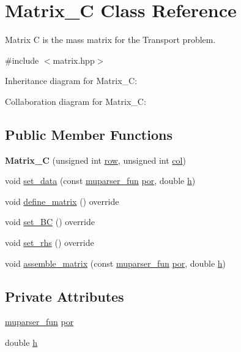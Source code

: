 \hypertarget{classMatrix__C}{}\section{Matrix\+\_\+C Class Reference}
\label{classMatrix__C}


Matrix C is the mass matrix for the Transport problem.  




{\ttfamily \#include $<$matrix.\+hpp$>$}



Inheritance diagram for Matrix\+\_\+C\+:


Collaboration diagram for Matrix\+\_\+C\+:
\subsection*{Public Member Functions}
\begin{DoxyCompactItemize}
\item 
\mbox{\label{classMatrix__C_a9e4a2ba41703e9547e7fa8fccf041966}} 
{\bfseries Matrix\+\_\+C} (unsigned int \hyperlink{classAbstractMatrix_a27fb46bf2853d4927d92a81b8b7773fb}{row}, unsigned int \hyperlink{classAbstractMatrix_af3ad3551ce094979488cef5df0e4fc1d}{col})
\item 
void \hyperlink{classMatrix__C_af91d61fdcd02ac2c6c87d2dbdbdf18a2}{set\+\_\+data} (const \hyperlink{classmuparser__fun}{muparser\+\_\+fun} \hyperlink{classMatrix__C_a45440dbea003cf386406ad510e32bc25}{por}, double \hyperlink{classMatrix__C_ac381c022ef4080ac749c69d92a9f5927}{h})
\item 
void \hyperlink{classMatrix__C_a062ab76d181505d1db2e391f02152376}{define\+\_\+matrix} () override
\item 
void \hyperlink{classMatrix__C_a9235c2dbf2853fae4122251726a7efce}{set\+\_\+\+BC} () override
\item 
void \hyperlink{classMatrix__C_af305bfe533e702d629df3fb0409bc8d2}{set\+\_\+rhs} () override
\item 
void \hyperlink{classMatrix__C_a63752476cb62dc7c22a9b9359f42a995}{assemble\+\_\+matrix} (const \hyperlink{classmuparser__fun}{muparser\+\_\+fun} \hyperlink{classMatrix__C_a45440dbea003cf386406ad510e32bc25}{por}, double \hyperlink{classMatrix__C_ac381c022ef4080ac749c69d92a9f5927}{h})
\end{DoxyCompactItemize}
\subsection*{Private Attributes}
\begin{DoxyCompactItemize}
\item 
\hyperlink{classmuparser__fun}{muparser\+\_\+fun} \hyperlink{classMatrix__C_a45440dbea003cf386406ad510e32bc25}{por}
\item 
double \hyperlink{classMatrix__C_ac381c022ef4080ac749c69d92a9f5927}{h}
\end{DoxyCompactItemize}
